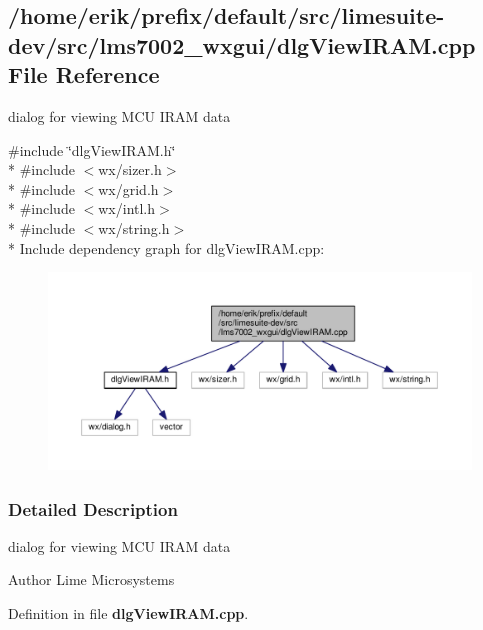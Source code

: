 \subsection{/home/erik/prefix/default/src/limesuite-\/dev/src/lms7002\+\_\+wxgui/dlg\+View\+I\+R\+AM.cpp File Reference}
\label{dlgViewIRAM_8cpp}


dialog for viewing M\+CU I\+R\+AM data  


{\ttfamily \#include \char`\"{}dlg\+View\+I\+R\+A\+M.\+h\char`\"{}}\\*
{\ttfamily \#include $<$wx/sizer.\+h$>$}\\*
{\ttfamily \#include $<$wx/grid.\+h$>$}\\*
{\ttfamily \#include $<$wx/intl.\+h$>$}\\*
{\ttfamily \#include $<$wx/string.\+h$>$}\\*
Include dependency graph for dlg\+View\+I\+R\+A\+M.\+cpp\+:
\nopagebreak
\begin{figure}[H]
\begin{center}
\leavevmode
\includegraphics[width=350pt]{d4/dc1/dlgViewIRAM_8cpp__incl}
\end{center}
\end{figure}


\subsubsection{Detailed Description}
dialog for viewing M\+CU I\+R\+AM data 

\begin{DoxyAuthor}{Author}
Lime Microsystems 
\end{DoxyAuthor}


Definition in file {\bf dlg\+View\+I\+R\+A\+M.\+cpp}.

